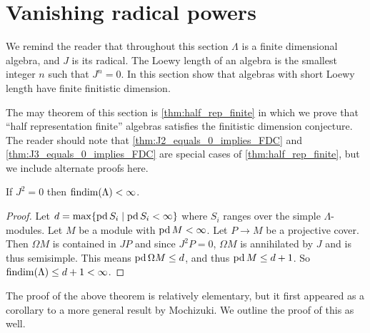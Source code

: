 \section{Vanishing radical powers}\label{sec:vanishing_radical}

We remind the reader that throughout this section $\Lambda$ is a finite dimensional algebra, and $J$ is its radical. The Loewy length of an algebra is the smallest integer $n$ such that $J^n = 0$. In this section show that algebras with short Loewy length have finite finitistic dimension.

The may theorem of this section is \cref{thm:half_rep_finite} in which we prove that ``half representation finite'' algebras satisfies the finitistic dimension conjecture. The reader should note that \cref{thm:J2_equals_0_implies_FDC} and \cref{thm:J3_equals_0_implies_FDC} are special cases of \cref{thm:half_rep_finite}, but we include alternate proofs here.

\begin{theorem}\label{thm:J2_equals_0_implies_FDC}
	If $J^2=0$ then $\operatorname{findim}(\Lambda) < \infty$.
	\begin{proof}
		Let $d = \max\{\operatorname{pd} S_i \mid \operatorname{pd} S_i < \infty\}$ where $S_i$ ranges over the simple $\Lambda$-modules. Let $M$ be a module with $\operatorname{pd} M < \infty$. Let $P \to M$ be a projective cover. Then $\Omega M$ is contained in $JP$ and since $J^2P=0$, $\Omega M$ is annihilated by $J$ and is thus semisimple. This means $\operatorname{pd} \Omega M \leq d$, and thus $\operatorname{pd} M \leq d+1$. So $\operatorname{findim}(\Lambda) \leq d+1 < \infty$.
	\end{proof}
\end{theorem}

The proof of the above theorem is relatively elementary, but it first appeared as a corollary to a more general result by Mochizuki\cite{Moc65}. We outline the proof of this as well.

